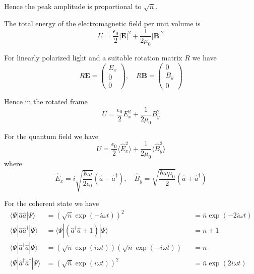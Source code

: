 \documentclass[12pt]{article}
\begin{document}
Hence the peak amplitude is proportional to $\sqrt{\bar n}$.

\bigskip
The total energy of the electromagnetic field per unit volume is
\begin{equation*}
U=\frac{\epsilon_0}{2}|\mathbf E|^2+\frac{1}{2\mu_0}|\mathbf B|^2
\end{equation*}

For linearly polarized light and a suitable rotation matrix $R$ we have
\begin{equation*}
R\mathbf E=\begin{pmatrix}E_x\\0\\0\end{pmatrix},
\quad
R\mathbf B=\begin{pmatrix}0\\B_y\\0\end{pmatrix}
\end{equation*}

Hence in the rotated frame
\begin{equation*}
U=\frac{\epsilon_0}{2}E_x^2+\frac{1}{2\mu_0}B_y^2
\end{equation*}

For the quantum field we have
\begin{equation*}
U=\frac{\epsilon_0}{2}\langle\hat E_x^2\rangle+\frac{1}{2\mu_0}\langle\hat B_y^2\rangle
\end{equation*}
where
\begin{equation*}
\hat E_x=i\sqrt{\frac{\hbar\omega}{2\epsilon_0}}(\hat a-\hat a^\dag),
\quad
\hat B_y=\sqrt{\frac{\hbar\omega\mu_0}{2}}(\hat a+\hat a^\dag)
\end{equation*}

For the coherent state we have
\begin{align*}
\langle\Psi|\hat a\hat a|\Psi\rangle&=\left(\sqrt{\bar n}\exp(-i\omega t)\right)^2
& &=\bar n\exp(-2i\omega t)
\\
\langle\Psi|\hat a\hat a^\dag|\Psi\rangle&=\langle\Psi|(\hat a^\dag\hat a+1)|\Psi\rangle
& &=\bar n+1
\\
\langle\Psi|\hat a^\dag\hat a|\Psi\rangle
&=\left(\sqrt{\bar n}\exp(i\omega t)\right)\left(\sqrt{\bar n}\exp(-i\omega t)\right)
& &=\bar n
\\
\langle\Psi|\hat a^\dag\hat a^\dag|\Psi\rangle&=\left(\sqrt{\bar n}\exp(i\omega t)\right)^2
& &=\bar n\exp(2i\omega t)
\end{align*}
\end{document}
